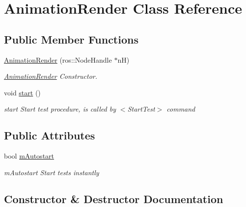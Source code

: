 \hypertarget{classAnimationRender}{}\section{Animation\+Render Class Reference}
\label{classAnimationRender}
\subsection*{Public Member Functions}
\begin{DoxyCompactItemize}
\item 
\hyperlink{classAnimationRender_add45175c946790a10451ba9cdb5caa37}{Animation\+Render} (ros\+::\+Node\+Handle $\ast$nH)
\begin{DoxyCompactList}\small\item\em \hyperlink{classAnimationRender}{Animation\+Render} Constructor. \end{DoxyCompactList}\item 
void \hyperlink{classAnimationRender_a5badc5fbb7d9c2ce6f4f9b6dda610615}{start} ()\hypertarget{classAnimationRender_a5badc5fbb7d9c2ce6f4f9b6dda610615}{}\label{classAnimationRender_a5badc5fbb7d9c2ce6f4f9b6dda610615}

\begin{DoxyCompactList}\small\item\em start Start test procedure, is called by $<$\+Start\+Test$>$ command \end{DoxyCompactList}\end{DoxyCompactItemize}
\subsection*{Public Attributes}
\begin{DoxyCompactItemize}
\item 
bool \hyperlink{classAnimationRender_a955bfd9f808425f7c07e84b170e296eb}{m\+Autostart}\hypertarget{classAnimationRender_a955bfd9f808425f7c07e84b170e296eb}{}\label{classAnimationRender_a955bfd9f808425f7c07e84b170e296eb}

\begin{DoxyCompactList}\small\item\em m\+Autostart Start tests instantly \end{DoxyCompactList}\end{DoxyCompactItemize}


\subsection{Constructor \& Destructor Documentation}

